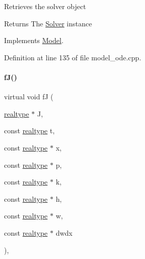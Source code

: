 Retrieves the solver object \begin{DoxyReturn}{Returns}
The \mbox{\hyperlink{classamici_1_1_solver}{Solver}} instance 
\end{DoxyReturn}


Implements \mbox{\hyperlink{classamici_1_1_model_a61d5b19b2e4d5ffcc73a014d59494344}{Model}}.



Definition at line 135 of file model\+\_\+ode.\+cpp.

\mbox{\label{classamici_1_1_model___o_d_e_a8b89346ce4703324beee7e7c4c8997b2}} 
\paragraph{\texorpdfstring{f\+J()}{fJ()}\hspace{0.1cm}{\footnotesize\ttfamily [3/3]}}
{\footnotesize\ttfamily virtual void fJ (\begin{DoxyParamCaption}\item[{\mbox{\hyperlink{namespaceamici_a1bdce28051d6a53868f7ccbf5f2c14a3}{realtype}} $\ast$}]{J,  }\item[{const \mbox{\hyperlink{namespaceamici_a1bdce28051d6a53868f7ccbf5f2c14a3}{realtype}}}]{t,  }\item[{const \mbox{\hyperlink{namespaceamici_a1bdce28051d6a53868f7ccbf5f2c14a3}{realtype}} $\ast$}]{x,  }\item[{const \mbox{\hyperlink{namespaceamici_a1bdce28051d6a53868f7ccbf5f2c14a3}{realtype}} $\ast$}]{p,  }\item[{const \mbox{\hyperlink{namespaceamici_a1bdce28051d6a53868f7ccbf5f2c14a3}{realtype}} $\ast$}]{k,  }\item[{const \mbox{\hyperlink{namespaceamici_a1bdce28051d6a53868f7ccbf5f2c14a3}{realtype}} $\ast$}]{h,  }\item[{const \mbox{\hyperlink{namespaceamici_a1bdce28051d6a53868f7ccbf5f2c14a3}{realtype}} $\ast$}]{w,  }\item[{const \mbox{\hyperlink{namespaceamici_a1bdce28051d6a53868f7ccbf5f2c14a3}{realtype}} $\ast$}]{dwdx }\end{DoxyParamCaption})\hspace{0.3cm}{\ttfamily [protected]}, {}}

